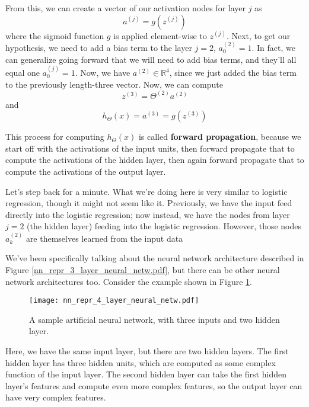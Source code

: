 From this, we can create a vector of our activation nodes for layer $j$ as 
\begin{equation}
a^{(j)} = g\left(z^{(j)}\right)
\end{equation}
where the sigmoid function $g$ is applied element-wise to $z^{(j)}$. Next, to get our hypothesis, we need to add a bias term to the layer $j=2$, $a_0^{(2)} = 1$. In fact, we can generalize going forward that we will need to add bias terms, and they'll all equal one $a_0^{(j)} = 1$. Now, we have $a^{(2)} \in \mathbb{R}^4$, since we just added the bias term to the previously length-three vector. Now, we can compute 
$$
z^{(3)} = \Theta^{(2)} a^{(2)}
$$
and 
$$
h_\Theta\left(x\right) = a^{(3)} = g\left(z^{(3)}\right)
$$

This process for computing $h_\Theta\left(x\right)$ is called \textbf{forward propagation}, because we start off with the activations of the input units, then forward propagate that to compute the activations of the hidden layer, then again forward propagate that to compute the activations of the output layer. 

Let's step back for a minute. What we're doing here is very similar to logistic regression, though it might not seem like it. Previously, we have the input feed directly into the logistic regression; now instead, we have the nodes from layer $j=2$ (the hidden layer) feeding into the logistic regression. However, those nodes $a_k^{(2)}$ are themselves learned from the input data

We've been specifically talking about the neural network architecture described in Figure \ref{nn_repr_3_layer_neural_netw.pdf}, but there can be other neural network architectures too. Consider the example shown in Figure \ref{nn_repr_4_layer_neural_netw.pdf}.
\begin{figure}[h] %
	\centering
	\graphicspath{{./Figures/}} %
	\texttt{[image: nn\_repr\_4\_layer\_neural\_netw.pdf]} 
	\caption[]{A sample artificial neural network, with three inputs and two hidden layer.}
	\label{nn_repr_4_layer_neural_netw.pdf}
\end{figure}
Here, we have the same input layer, but there are two hidden layers. The first hidden layer has three hidden units, which are computed as some complex function of the input layer. The second hidden layer can take the first hidden layer's features and compute even more complex features, so the output layer can have very complex features. 


